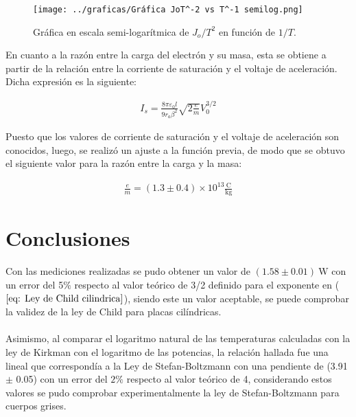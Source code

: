 \documentclass[%
 reprint,
 amsmath,amssymb,
 aps,
]{revtex4-2}
\begin{document}
\begin{figure}[H]
    \centering
    \texttt{[image: ../graficas/Gráfica JoT^-2 vs T^-1 semilog.png]}
    \caption{Gráfica en escala semi-logarítmica de $J_{o}/T^{2}$ en función de $1/T$.}
    \label{fig: Grafica Ley de Richardson}
\end{figure}

\vspace{0.2 cm}
En cuanto a la razón entre la carga del electrón y su masa, esta se obtiene a partir de la relación entre la corriente de saturación y el voltaje de aceleración. Dicha expresión es la siguiente:

\begin{align}
    I_{s} = \frac{8\pi \varepsilon_{0}l}{9r_{a}\beta^{2}}\sqrt{2\frac{e}{m}}V_{0}^{3/2}
    \label{11}
\end{align}

\vspace{0.2 cm}
Puesto que los valores de corriente de saturación y el voltaje de aceleración son conocidos, luego, se realizó un ajuste a la función previa, de modo que se obtuvo el siguiente valor para la razón entre la carga y la masa:

\begin{align*}
    \frac{e}{m} = (1.3 \pm 0.4)\times 10^{13} \frac{\text{C}}{\text{kg}}
\end{align*}



\section{Conclusiones}

Con las mediciones realizadas se pudo obtener un valor de $(1.58\pm 0.01)\ \text{W}$ con un error del 5$\%$ respecto al valor teórico de 3/2 definido para el exponente en ($\ref{eq: Ley de Child cilindrica}$), siendo este un valor aceptable, se puede comprobar la validez de la  ley de Child para placas cilíndricas.
\\\\
Asimismo, al comparar el logaritmo natural de las temperaturas calculadas con la ley de Kirkman con el logaritmo de las potencias, la relación hallada fue una lineal que correspondía a la Ley de Stefan-Boltzmann con una pendiente de (3.91 $\pm$ 0.05) con un error del $2\%$ respecto al valor teórico de 4, considerando estos valores se pudo comprobar experimentalmente la ley de Stefan-Boltzmann para cuerpos grises.
\\
\end{document}
